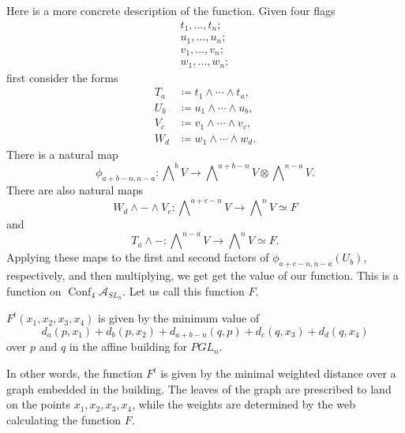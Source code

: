 \documentclass[ALCO,ThmDefs,Unicode,epreuves]{cedram}
\newcommand{\A}{\mathcal{A}}
\newcommand{\Conf}{\operatorname{Conf}}
\begin{document}
Here is a more concrete description of the function. Given four flags 
\begin{gather*}
t_1, \dots, t_n;
\\
u_1, \dots, u_n;
\\
v_1, \dots, v_n;
\\
w_1, \dots, w_n;
\end{gather*}
first consider the forms
\begin{align*}
T_a &\coloneqq  t_1 \wedge \cdots \wedge t_a,
\\
U_b &\coloneqq  u_1 \wedge \cdots \wedge u_b,
\\
V_c &\coloneqq  v_1 \wedge \cdots \wedge v_c,
\\
W_d &\coloneqq  w_1 \wedge \cdots \wedge w_d.
\end{align*}
There is a natural map 
\[
\phi_{a+b-n, n-a}: \bigwedge\nolimits^{b} V \rightarrow \bigwedge\nolimits^{a+b-n} V \otimes \bigwedge\nolimits^{n-a} V.
\]
There are also natural maps 
\[
W_d \wedge - \wedge V_c : \bigwedge\nolimits^{a+c-n} V \rightarrow \bigwedge\nolimits^{n} V \simeq F
\] 
and 
\[
T_a \wedge - : \bigwedge\nolimits^{n-a} V \rightarrow \bigwedge\nolimits^{n} V \simeq F.
\]
Applying these maps to the first and second factors of $\phi_{a+c-n,n-a}(U_b)$, respectively, and then multiplying, we get get the value of our function. This is a function on $\Conf_4 \A_{SL_{n}}$. Let us call this function $F$.

\begin{conj} $F^t(x_1,x_2,x_3,x_4)$ is given by the minimum value of
\[
d_a(p,x_1) + d_b(p,x_2) + d_{a+b-n}(q,p) + d_c(q,x_3) + d_d(q,x_4)
\]
over $p$ and $q$ in the affine building for $PGL_n$.
\end{conj}

In other words, the function $F^t$ is given by the minimal weighted distance over a graph embedded in the building. The leaves of the graph are prescribed to land on the points $x_1, x_2, x_3, x_4$, while the weights are determined by the web calculating the function $F$.






\end{document}
